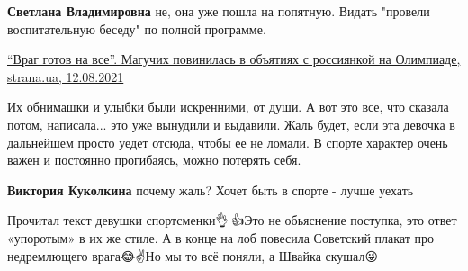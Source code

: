 \begin{itemize}
\begin{itemize}
 
\textbf{Светлана Владимировна} не, она уже пошла на попятную. Видать "провели воспитательную беседу" по полной программе.

\href{https://strana.ua/news/348425-mahuchikh-povinilas-v-potere-bditelnosti-na-olimpiade-i-objatijakh-s-rossijankoj.html}{%
\enquote{Враг готов на все}. Магучих повинилась в объятиях с россиянкой на Олимпиаде, strana.ua, 12.08.2021%
}

\end{itemize}

 

Их обнимашки и улыбки были искренними, от души. А вот это все, что сказала
потом, написала... это уже вынудили и выдавили. Жаль будет, если эта девочка в
дальнейшем просто уедет отсюда, чтобы ее не ломали. В спорте характер очень
важен и постоянно прогибаясь, можно потерять себя.

\begin{itemize}
 
\textbf{Виктория Куколкина} почему жаль? Хочет быть в спорте - лучше уехать
\end{itemize}

 

Прочитал текст девушки спортсменки👌🤝👍Это не обьяснение поступка, это ответ
«упоротым» в их же стиле. А в конце на лоб повесила Советский плакат про
недремлющего врага😂✌️Но мы то всё поняли, а Швайка скушал😜


\end{itemize}
